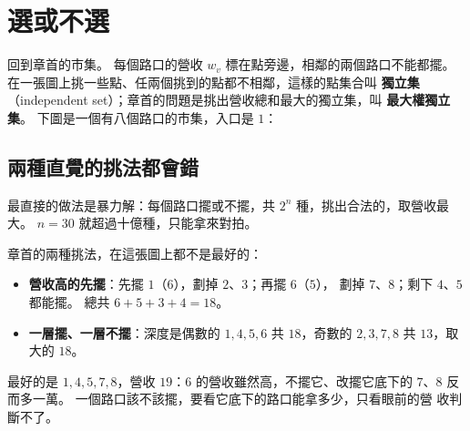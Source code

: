 \section{選或不選}
\label{sec:tdp-mis}

回到章首的市集。 每個路口的營收 $w_v$ 標在點旁邊，相鄰的兩個路口不能都擺。 在一張圖上挑一些點、任兩個挑到的點都不相鄰，這樣的點集合叫
\textbf{獨立集}（independent set）；章首的問題是挑出營收總和最大的獨立集，叫
\textbf{最大權獨立集}。 下圖是一個有八個路口的市集，入口是 $1$：

\begin{center}
\label{fig:tdp-mis}
\end{center}

\subsection{兩種直覺的挑法都會錯}

最直接的做法是暴力解：每個路口擺或不擺，共 $2^n$ 種，挑出合法的，取營收最大。
$n = 30$ 就超過十億種，只能拿來對拍。

章首的兩種挑法，在這張圖上都不是最好的：

\begin{itemize}
\item \textbf{營收高的先擺}：先擺 $1$（$6$），劃掉 $2$、$3$；再擺 $6$（$5$），
劃掉 $7$、$8$；剩下 $4$、$5$ 都能擺。 總共 $6 + 5 + 3 + 4 = 18$。
\item \textbf{一層擺、一層不擺}：深度是偶數的 $1, 4, 5, 6$ 共 $18$，奇數的
$2, 3, 7, 8$ 共 $13$，取大的 $18$。
\end{itemize}

最好的是 $1, 4, 5, 7, 8$，營收 $19$：$6$ 的營收雖然高，不擺它、改擺它底下的
$7$、$8$ 反而多一萬。 一個路口該不該擺，要看它底下的路口能拿多少，只看眼前的營
收判斷不了。

